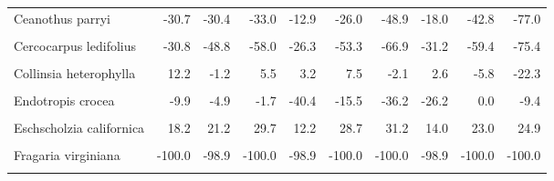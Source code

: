 \begin{longtable}[t]{lrrrrrrrrr}
Ceanothus parryi & -30.7 & -30.4 & -33.0 & -12.9 & -26.0 & -48.9 & -18.0 & -42.8 & -77.0\\
\cellcolor{gray!10}{Cercis occidentalis} & \cellcolor{gray!10}{52.8} & \cellcolor{gray!10}{67.6} & \cellcolor{gray!10}{94.2} & \cellcolor{gray!10}{39.2} & \cellcolor{gray!10}{86.8} & \cellcolor{gray!10}{113.7} & \cellcolor{gray!10}{48.7} & \cellcolor{gray!10}{82.7} & \cellcolor{gray!10}{81.3}\\
Cercocarpus ledifolius & -30.8 & -48.8 & -58.0 & -26.3 & -53.3 & -66.9 & -31.2 & -59.4 & -75.4\\
\cellcolor{gray!10}{Claytonia lanceolata} & \cellcolor{gray!10}{-45.9} & \cellcolor{gray!10}{-64.6} & \cellcolor{gray!10}{-48.4} & \cellcolor{gray!10}{-45.4} & \cellcolor{gray!10}{-48.8} & \cellcolor{gray!10}{-52.7} & \cellcolor{gray!10}{-54.2} & \cellcolor{gray!10}{-60.9} & \cellcolor{gray!10}{-76.7}\\
\addlinespace
Collinsia heterophylla & 12.2 & -1.2 & 5.5 & 3.2 & 7.5 & -2.1 & 2.6 & -5.8 & -22.3\\
\cellcolor{gray!10}{Crataegus douglasii} & \cellcolor{gray!10}{268.7} & \cellcolor{gray!10}{200.6} & \cellcolor{gray!10}{217.0} & \cellcolor{gray!10}{257.4} & \cellcolor{gray!10}{218.3} & \cellcolor{gray!10}{70.1} & \cellcolor{gray!10}{277.7} & \cellcolor{gray!10}{140.6} & \cellcolor{gray!10}{80.2}\\
Endotropis crocea & -9.9 & -4.9 & -1.7 & -40.4 & -15.5 & -36.2 & -26.2 & 0.0 & -9.4\\
\cellcolor{gray!10}{Ericameria linearifolia} & \cellcolor{gray!10}{-100.0} & \cellcolor{gray!10}{-100.0} & \cellcolor{gray!10}{-100.0} & \cellcolor{gray!10}{-100.0} & \cellcolor{gray!10}{-100.0} & \cellcolor{gray!10}{-100.0} & \cellcolor{gray!10}{-100.0} & \cellcolor{gray!10}{-100.0} & \cellcolor{gray!10}{-100.0}\\
Eschscholzia californica & 18.2 & 21.2 & 29.7 & 12.2 & 28.7 & 31.2 & 14.0 & 23.0 & 24.9\\
\addlinespace
\cellcolor{gray!10}{Fallugia paradoxa} & \cellcolor{gray!10}{-87.7} & \cellcolor{gray!10}{-89.3} & \cellcolor{gray!10}{-91.4} & \cellcolor{gray!10}{-86.7} & \cellcolor{gray!10}{-91.2} & \cellcolor{gray!10}{-85.2} & \cellcolor{gray!10}{-92.5} & \cellcolor{gray!10}{-94.0} & \cellcolor{gray!10}{-91.6}\\
Fragaria virginiana & -100.0 & -98.9 & -100.0 & -98.9 & -100.0 & -100.0 & -98.9 & -100.0 & -100.0\\
\cellcolor{gray!10}{Geraea canescens} & \cellcolor{gray!10}{20.5} & \cellcolor{gray!10}{30.5} & \cellcolor{gray!10}{60.9} & \cellcolor{gray!10}{18.8} & \cellcolor{gray!10}{49.9} & \cellcolor{gray!10}{60.8} & \cellcolor{gray!10}{36.1} & \cellcolor{gray!10}{68.0} & \cellcolor{gray!10}{104.8}\\

\end{longtable}
